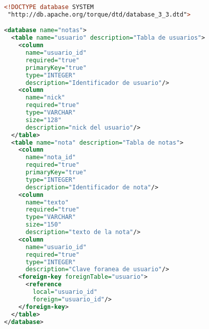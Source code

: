 \begin{lstlisting}[language=xml]
<!DOCTYPE database SYSTEM
 "http://db.apache.org/torque/dtd/database_3_3.dtd">

<database name="notas">
  <table name="usuario" description="Tabla de usuarios">
    <column
      name="usuario_id"
      required="true"
      primaryKey="true"
      type="INTEGER"
      description="Identificador de usuario"/>
    <column
      name="nick"
      required="true"
      type="VARCHAR"
      size="128"
      description="nick del usuario"/>
  </table>
  <table name="nota" description="Tabla de notas">
    <column
      name="nota_id"
      required="true"
      primaryKey="true"
      type="INTEGER"
      description="Identificador de nota"/>
    <column
      name="texto"
      required="true"
      type="VARCHAR"
      size="150"
      description="texto de la nota"/>
	<column
      name="usuario_id"
      required="true"
      type="INTEGER"
      description="Clave foranea de usuario"/>
	<foreign-key foreignTable="usuario">
      <reference
        local="usuario_id"
        foreign="usuario_id"/>
    </foreign-key>
  </table>
</database>
\end{lstlisting}